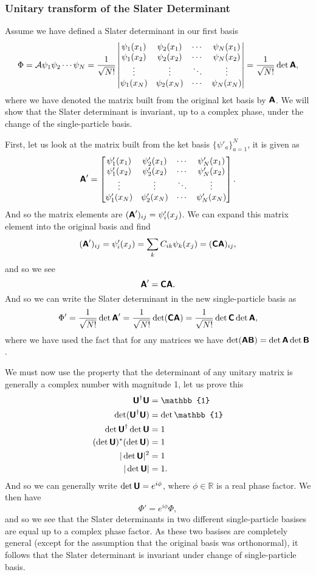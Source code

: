 \documentclass[a4paper, 11pt, notitlepage, english]{article}
\newcommand{\mat}[1]{\textsf{\textbf{#1}}}
\begin{document}
\subsubsection*{Unitary transform of the Slater Determinant}
Assume we have defined a Slater determinant in our first basis
$$\Phi = \mathcal{A}\psi_1\psi_2\cdots\psi_N = \frac{1}{\sqrt{N!}}
\begin{vmatrix}
\psi_1(x_1) & \psi_2 (x_1) & \cdots & \psi_N(x_1) \\
\psi_1(x_2) & \psi_2 (x_2) & \cdots & \psi_N(x_2) \\
\vdots & \vdots & \ddots & \vdots \\
\psi_1(x_N) & \psi_2 (x_N) & \cdots & \psi_N(x_N) \\
\end{vmatrix} = \frac{1}{\sqrt{N!}} \det \mat A, $$
where we have denoted the matrix built from the original ket basis by $\mat A$. We will show that the Slater determinant is invariant, up to a complex phase, under the change of the single-particle basis.

First, let us look at the matrix built from the ket basis $\{\psi'_a\}_{a=1}^N$, it is given as
$$\mat A' = \begin{bmatrix}
\psi'_1(x_1) & \psi'_2 (x_1) & \cdots & \psi'_N(x_1) \\
\psi'_1(x_2) & \psi'_2 (x_2) & \cdots & \psi'_N(x_2) \\
\vdots & \vdots & \ddots & \vdots \\
\psi'_1(x_N) & \psi'_2 (x_N) & \cdots & \psi'_N(x_N) \end{bmatrix}.$$
And so the matrix elements are $(\mat A')_{ij} = \psi'_i(x_j)$. We can expand this matrix element into the original basis and find
$$(\mat A')_{ij} = \psi'_i(x_j) = \sum_k C_{ik}\psi_k(x_j) = (\mat C \mat A)_{ij},$$
and so we see 
$$\mat A' = \mat C \mat A.$$
And so we can write the Slater determinant in the new single-particle basis as
$$\Phi' = \frac{1}{\sqrt{N!}} \det \mat A' = \frac{1}{\sqrt{N!}} \det (\mat C \mat A) = \frac{1}{\sqrt{N!}} \det \mat C \det \mat A,$$
where we have used the fact that for any matrices we have $\det(\mat A \mat B) = \det \mat A \det \mat B$.

We must now use the property that the determinant of any unitary matrix is generally a complex number with magnitude 1, let us prove this
\begin{align*}
\mat U^\dag \mat U &= \mathbb{1} \\
\det (\mat U^\dag \mat U) &= \det \mathbb{1} \\
\det \mat U^\dag \det \mat U &= 1 \\
(\det \mat U)^* (\det \mat U) &= 1 \\
|\det \mat U|^2 &= 1 \\
|\det \mat U| &= 1.
\end{align*}
And so we can generally write $\det \mat U = e^{i\phi}$, where $\phi \in \mathbb{R}$ is a real phase factor. We then have
$$\Phi' = e^{i\phi} \Phi,$$
and so we see that the Slater determinants in two different single-particle basises are equal up to a complex phase factor. As these two basises are completely general (except for the assumption that the original basis was orthonormal), it follows that the Slater determinant is invariant under change of single-particle basis.
\end{document}
